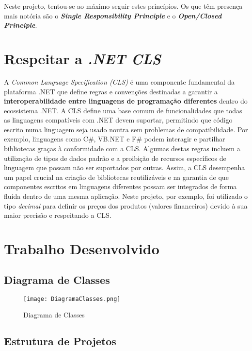 \documentclass[11pt]{scrartcl} %
\begin{document}
Neste projeto, tentou-se ao máximo seguir estes princípios. Os que têm presença mais notória são o \textbf{\textit{Single Responsibility Principle}} e o \textbf{\textit{Open/Closed Principle}}.

\section{Respeitar a \textbf{\textit{.NET CLS}}}
A \textit{Common Language Specification (CLS)} é uma componente fundamental da plataforma .NET que define regras e convenções destinadas a garantir a \textbf{interoperabilidade entre linguagens de programação diferentes} dentro do ecossistema .NET. A CLS define uma base comum de funcionalidades que todas as linguagens compatíveis com .NET devem suportar, permitindo que código escrito numa linguagem seja usado noutra sem problemas de compatibilidade. Por exemplo, linguagens como C\#, VB.NET e F\# podem interagir e partilhar bibliotecas graças à conformidade com a CLS. Algumas destas regras incluem a utilização de tipos de dados padrão e a proibição de recursos específicos de linguagem que possam não ser suportados por outras. Assim, a CLS desempenha um papel crucial na criação de bibliotecas reutilizáveis e na garantia de que componentes escritos em linguagens diferentes possam ser integrados de forma fluída dentro de uma mesma aplicação.
Neste projeto, por exemplo, foi utilizado o tipo \textit{decimal} para definir os preços dos produtos (valores financeiros) devido à sua maior precisão e respeitando a CLS. 

\newpage

\section{Trabalho Desenvolvido}
\subsection{Diagrama de Classes}
\begin{figure}[h] %
	\centering
	\texttt{[image: DiagramaClasses.png]} %
	\caption{Diagrama de Classes}
\end{figure}

\newpage

\subsection{Estrutura de Projetos}
\end{document}
